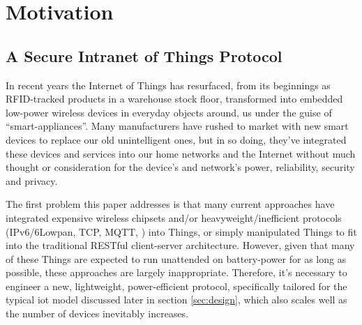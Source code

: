 \documentclass[conference]{./sty/IEEEtran}
\begin{document}

\section{Motivation} %
\label{sec:motivation}
\subsection{A Secure Intranet of Things Protocol} %
\label{sub:intranet_of_things_protocol}
In recent years the Internet of Things has resurfaced, from its beginnings as RFID-tracked products in a warehouse stock floor, transformed into embedded low-power wireless devices in everyday objects around, us under the guise of ``smart-appliances''. Many manufacturers have rushed to market with new smart devices to replace our old unintelligent ones, but in so doing, they've integrated these devices and services into our home networks and the Internet without much thought or consideration for the device's and network's power, reliability, security and privacy. 

The first problem this paper addresses is that many current approaches have integrated expensive wireless chipsets and/or heavyweight/inefficient protocols (IPv6/6Lowpan, TCP, MQTT\cite{MQTT}, \cite{xAP}) into Things, or simply manipulated Things to fit into the traditional RESTful client-server architecture\cite{IETF_COAP_HTTP}. However, given that many of these Things are expected to run unattended on battery-power for as long as possible, these approaches are largely inappropriate. Therefore, it's necessary to engineer a new, lightweight, power-efficient protocol, specifically tailored for the typical iot model discussed later in section \ref{sec:design}, which also scales well as the number of devices inevitably increases. 
\end{document}
